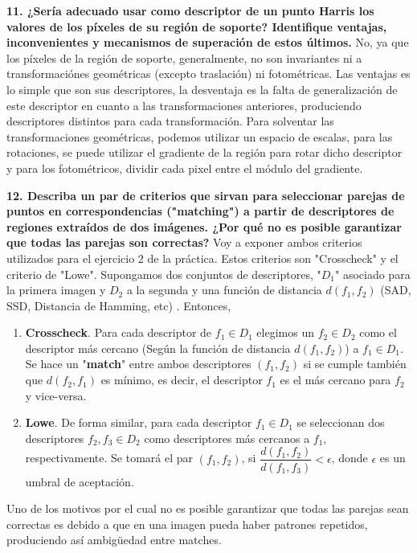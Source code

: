 \documentclass[12pt,a4paper]{article}
\begin{document}
	\textbf{11. ¿Sería adecuado usar como descriptor de un punto Harris los valores de los píxeles de su región de soporte? Identifique ventajas, inconvenientes y mecanismos de superación de estos últimos.}
	\newline\newline
	No, ya que los píxeles de la región de soporte, generalmente, no son invariantes ni a transformaciónes geométricas (excepto traslación) ni fotométricas.\newline\newline
	Las ventajas es lo simple que son sus descriptores, la desventaja es la falta de generalización de este descriptor en cuanto a las transformaciones anteriores, produciendo descriptores distintos para cada transformación. \newline
	Para solventar las transformaciones geométricas, podemos utilizar un espacio de escalas, para las rotaciones, se puede utilizar el gradiente de la región para rotar dicho descriptor y para los fotométricos, dividir cada pixel entre el módulo del gradiente.
	
	\newpage
	
	\textbf{12. Describa un par de criterios que sirvan para seleccionar parejas de puntos en correspondencias ("matching") a partir de descriptores de regiones extraídos de dos imágenes. ¿Por qué no es posible garantizar que todas las parejas son correctas?}
	\newline\newline
	Voy a exponer ambos criterios utilizados para el ejercicio 2 de la práctica. Estos criterios son "Crosscheck" y el criterio de "Lowe". Supongamos dos conjuntos de descriptores, "$D_1$" asociado para la primera imagen y $D_2$ a la segunda y una función de distancia $d(f_1, f_2)$ (SAD, SSD, Distancia de Hamming, etc) . Entonces,
	\begin{enumerate}
		\item \textbf{Crosscheck}. Para cada descriptor de $f_1 \in D_1$ elegimos un $f_2 \in D_2$ como el descriptor más cercano (Según la función de distancia $d(f_1, f_2)$) a $f_1 \in D_1$. Se hace un "\textbf{match}" entre ambos descriptores $(f_1, f_2)$ si se cumple también que $d(f_2, f_1)$ es mínimo, es decir, el descriptor $f_1$ es el más cercano para $f_2$ y vice-versa. 
		\item \textbf{Lowe}. De forma similar, para cada descriptor $f_1 \in D_1$ se seleccionan dos descriptores $f_2, f_3 \in D_2$ como descriptores más cercanos a $f_1$, respectivamente. Se tomará el par $(f_1, f_2)$, si $\dfrac{d(f_1, f_2)}{d(f_1, f_3)}< \epsilon$, donde $\epsilon$ es un umbral de aceptación.
	\end{enumerate}
	Uno de los motivos por el cual no es posible garantizar que todas las parejas sean correctas es debido a que en una imagen pueda haber patrones repetidos, produciendo así ambigüedad entre matches.
	
\end{document}
